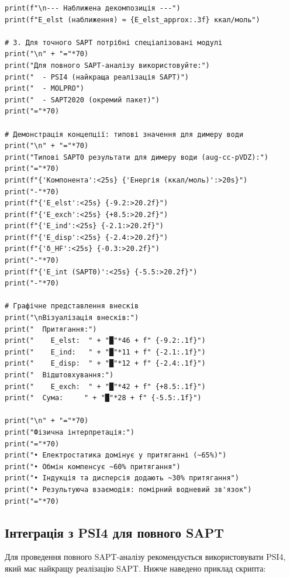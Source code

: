 \begin{verbatim}
print(f"\n--- Наближена декомпозиція ---")
print(f"E_elst (наближення) ≈ {E_elst_approx:.3f} ккал/моль")

# 3. Для точного SAPT потрібні спеціалізовані модулі
print("\n" + "="*70)
print("Для повного SAPT-аналізу використовуйте:")
print("  - PSI4 (найкраща реалізація SAPT)")
print("  - MOLPRO")
print("  - SAPT2020 (окремий пакет)")
print("="*70)

# Демонстрація концепції: типові значення для димеру води
print("\n" + "="*70)
print("Типові SAPT0 результати для димеру води (aug-cc-pVDZ):")
print("="*70)
print(f"{'Компонента':<25s} {'Енергія (ккал/моль)':>20s}")
print("-"*70)
print(f"{'E_elst':<25s} {-9.2:>20.2f}")
print(f"{'E_exch':<25s} {+8.5:>20.2f}")
print(f"{'E_ind':<25s} {-2.1:>20.2f}")
print(f"{'E_disp':<25s} {-2.4:>20.2f}")
print(f"{'δ_HF':<25s} {-0.3:>20.2f}")
print("-"*70)
print(f"{'E_int (SAPT0)':<25s} {-5.5:>20.2f}")
print("-"*70)

# Графічне представлення внесків
print("\nВізуалізація внесків:")
print("  Притягання:")
print("    E_elst:  " + "█"*46 + f" {-9.2:.1f}")
print("    E_ind:   " + "█"*11 + f" {-2.1:.1f}")
print("    E_disp:  " + "█"*12 + f" {-2.4:.1f}")
print("  Відштовхування:")
print("    E_exch:  " + "█"*42 + f" {+8.5:.1f}")
print("  Сума:     " + "█"*28 + f" {-5.5:.1f}")

print("\n" + "="*70)
print("Фізична інтерпретація:")
print("="*70)
print("• Електростатика домінує у притяганні (~65%)")
print("• Обмін компенсує ~60% притягання")
print("• Індукція та дисперсія додають ~30% притягання")
print("• Результуюча взаємодія: помірний водневий зв'язок")
print("="*70)
\end{verbatim}

\subsection{Інтеграція з PSI4 для повного SAPT}

Для проведення повного SAPT-аналізу рекомендується використовувати PSI4, який має найкращу реалізацію SAPT. Нижче наведено приклад скрипта:

